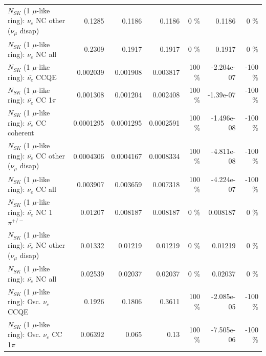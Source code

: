 \begin{table}
\begin{tabular}{| l | r | r | r  r | r  r |}
                $N_{SK}$ (1 $\mu$-like ring): $\nu_e$ NC other ($\nu_\mu$ disap) &          0.1285 &          0.1186 &          0.1186 &        0 \%  &          0.1186 &        0 \%  \\ 
                                  $N_{SK}$ (1 $\mu$-like ring): $\nu_{e}$ NC all &          0.2309 &          0.1917 &          0.1917 &        0 \%  &          0.1917 &        0 \%  \\ 
\hline
\hline
\hline
                                $N_{SK}$ (1 $\mu$-like ring): $\bar{\nu_e}$ CCQE &        0.002039 &        0.001908 &        0.003817 &      100 \%  &      -2.204e-07 &     -100 \%  \\ 
                           $N_{SK}$ (1 $\mu$-like ring): $\bar{\nu_e}$ CC 1$\pi$ &        0.001308 &        0.001204 &        0.002408 &      100 \%  &       -1.39e-07 &     -100 \%  \\ 
                         $N_{SK}$ (1 $\mu$-like ring): $\bar{\nu_e}$ CC coherent &       0.0001295 &       0.0001295 &       0.0002591 &      100 \%  &      -1.496e-08 &     -100 \%  \\ 
          $N_{SK}$ (1 $\mu$-like ring): $\bar{\nu_e}$ CC other ($\nu_\mu$ disap) &       0.0004306 &       0.0004167 &       0.0008334 &      100 \%  &      -4.811e-08 &     -100 \%  \\ 
                            $N_{SK}$ (1 $\mu$-like ring): $\bar{\nu_{e}}$ CC all &        0.003907 &        0.003659 &        0.007318 &      100 \%  &      -4.224e-07 &     -100 \%  \\ 
\hline
                     $N_{SK}$ (1 $\mu$-like ring): $\bar{\nu_e}$ NC 1$\pi^{+/-}$ &         0.01207 &        0.008187 &        0.008187 &        0 \%  &        0.008187 &        0 \%  \\ 
          $N_{SK}$ (1 $\mu$-like ring): $\bar{\nu_e}$ NC other ($\nu_\mu$ disap) &         0.01332 &         0.01219 &         0.01219 &        0 \%  &         0.01219 &        0 \%  \\ 
                            $N_{SK}$ (1 $\mu$-like ring): $\bar{\nu_{e}}$ NC all &         0.02539 &         0.02037 &         0.02037 &        0 \%  &         0.02037 &        0 \%  \\ 
\hline
\hline
\hline
                                 $N_{SK}$ (1 $\mu$-like ring): Osc. $\nu_e$ CCQE &          0.1926 &          0.1806 &          0.3611 &      100 \%  &      -2.085e-05 &     -100 \%  \\ 
                            $N_{SK}$ (1 $\mu$-like ring): Osc. $\nu_e$ CC 1$\pi$ &         0.06392 &           0.065 &            0.13 &      100 \%  &      -7.505e-06 &     -100 \%  \\ 

\end{tabular}
\end{table}
